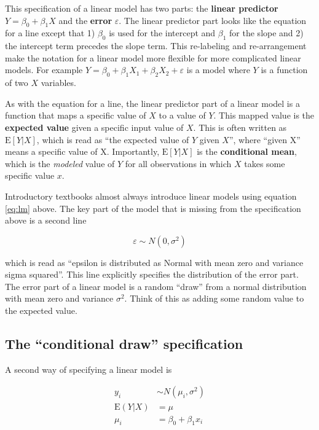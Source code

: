 \documentclass[]{book}
\begin{document}
This specification of a linear model has two parts: the \textbf{linear
predictor} \(Y = \beta_0 + \beta_1 X\) and the \textbf{error}
\(\varepsilon\). The linear predictor part looks like the equation for a
line except that 1) \(\beta_0\) is used for the intercept and
\(\beta_1\) for the slope and 2) the intercept term precedes the slope
term. This re-labeling and re-arrangement make the notation for a linear
model more flexible for more complicated linear models. For example
\(Y = \beta_0 + \beta_1 X_1 + \beta_2 X_2 + \varepsilon\) is a model
where \(Y\) is a function of two \(X\) variables.

As with the equation for a line, the linear predictor part of a linear
model is a function that maps a specific value of \(X\) to a value of
\(Y\). This mapped value is the \textbf{expected value} given a specific
input value of \(X\). This is often written as \(\mathrm{E}[Y|X]\),
which is read as ``the expected value of \(Y\) given \(X\)'', where
``given X'' means a specific value of X. Importantly,
\(\mathrm{E}[Y|X]\) is the \textbf{conditional mean}, which is the
\emph{modeled} value of \(Y\) for all observations in which \(X\) takes
some specific value \(x\).

Introductory textbooks almost always introduce linear models using
equation \eqref{eq:lm} above. The key part of the model that is missing
from the specification above is a second line

\begin{equation}
\varepsilon \sim N(0, \sigma^2)
\end{equation}

which is read as ``epsilon is distributed as Normal with mean zero and
variance sigma squared''. This line explicitly specifies the
distribution of the error part. The error part of a linear model is a
random ``draw'' from a normal distribution with mean zero and variance
\(\sigma^2\). Think of this as adding some random value to the expected
value.

\subsection{\texorpdfstring{The ``conditional draw''
specification}{The conditional draw specification}}\label{the-conditional-draw-specification}

A second way of specifying a linear model is

\begin{align}
y_i &\sim N(\mu_i, \sigma^2)\\
\mathrm{E}(Y|X) &= \mu\\
\mu_i &= \beta_0 + \beta_1 x_i
\label{eq:lm-spec2}
\end{align}
\end{document}
